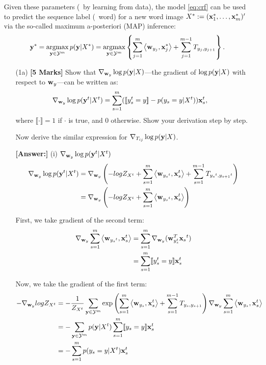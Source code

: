 \documentclass[11pt]{report}
\begin{document}
Given these parameters (\eg\ by learning from data), the model \eqref{eq:crf} can be used to predict the sequence label (\ie\ word) for a new word image $X^* := (\mathbf{\boldsymbol{x}}^*_1, \ldots, \mathbf{\boldsymbol{x}}^*_m)'$ via the so-called maximum a-posteriori (MAP) inference:
\begin{align}
	\label{eq:crf_decode}
	\mathbf{\boldsymbol{y}}^* = \operatorname*{\mathrm{argmax}}_{\mathbf{\boldsymbol{y}} \in \mathcal{Y}^m} p(\mathbf{\boldsymbol{y}} | X^*)
	= \operatorname*{\mathrm{argmax}}_{\mathbf{\boldsymbol{y}} \in \mathcal{Y}^m} \left\{ \sum_{j=1}^m \left\langle \mathbf{\boldsymbol{w}}_{y_j},\mathbf{\boldsymbol{x}}^*_j \right\rangle + \sum_{j=1}^{m-1} T_{y_j, y_{j+1}}\right\}.
\end{align}




\begin{itemize}
	\item[(1a)] {\bf [5 Marks]} Show that ${\nabla}_{\mathbf{\boldsymbol{w}}_y} \log p(\mathbf{\boldsymbol{y}}|X)$---the gradient of $\log p(\mathbf{\boldsymbol{y}}|X)$ with respect to $\mathbf{\boldsymbol{w}}_y$---can be written as:
	\begin{align}
		{\nabla}_{\mathbf{\boldsymbol{w}}_y} \log p(\mathbf{\boldsymbol{y}}^t|X^t) &= \sum_{s=1}^m ([\![y^t_s = y]\!] - p(y_s = y | X^t)) \mathbf{\boldsymbol{x}}^t_s,
	\end{align}
	where $\llbracket \cdot \rrbracket = 1$ if $\cdot$ is true, and 0 otherwise.
	Show your derivation step by step.
	
	Now derive the similar expression for ${\nabla}_{T_{ij}} \log p(\mathbf{\boldsymbol{y}}|X)$.
	
		{\bf [Answer:]} 
	(i) ${\nabla}_{\mathbf{\boldsymbol{w}}_y} \log p(\mathbf{\boldsymbol{y}}^t|X^t)$
	\begin{align}
		{\nabla}_{\mathbf{\boldsymbol{w}}_y} \log p(\mathbf{\boldsymbol{y}}^t|X^t) &= {\nabla}_{\mathbf{\boldsymbol{w}}_y} \left(-logZ_{X^t} + \sum_{s=1}^m \left\langle \mathbf{\boldsymbol{w}}_{{y_s}^t},\mathbf{\boldsymbol{x}}_s^t \right\rangle + \sum_{s=1}^{m-1} T_{{y_s}^t, {y_{s+1}}^t}\right) \\ 
		&={\nabla}_{\mathbf{\boldsymbol{w}}_y} \left(-logZ_{X^t} + \sum_{s=1}^m \left\langle \mathbf{\boldsymbol{w}}_{{y_s}^t},\mathbf{\boldsymbol{x}}_s^t \right\rangle\right)
	\end{align}

	First, we take gradient of the second term: 
	\begin{align}
		{\nabla}_{\mathbf{\boldsymbol{w}}_y} \sum_{s=1}^m \left\langle \mathbf{\boldsymbol{w}}_{{y_s}^t},\mathbf{\boldsymbol{x}}_s^t \right\rangle &= \sum_{s=1}^m {\nabla}_{\mathbf{\boldsymbol{w}}_y} (\mathbf{\boldsymbol{w}}_{y_s^t}^T {{\mathbf{\boldsymbol{x}}_s}^t}) \\
		&= \sum_{s=1}^m [\![y^t_s = y]\!] \mathbf{\boldsymbol{x}}^t_s
	\end{align}

	Now, we take the gradient of the first term: 
	\begin{align}
		\label{eq:gradient_wy}
		-{\nabla}_{\mathbf{\boldsymbol{w}}_y} logZ_{X^t} &= -\frac{1}{Z_{X^t}} \sum_{\mathbf{\boldsymbol{y}} \in \mathcal{Y}^m}\exp \left(\sum_{s=1}^m \left\langle \mathbf{\boldsymbol{w}}_{y_s},\mathbf{\boldsymbol{x}}_s^t \right\rangle + \sum_{s=1}^{m-1} T_{y_s, y_{s+1}}\right) {\nabla}_{\mathbf{\boldsymbol{w}}_y} \sum_{s=1}^m \left\langle \mathbf{\boldsymbol{w}}_{y_s},\mathbf{\boldsymbol{x}}_s^t \right\rangle \\
		&= -\sum_{\mathbf{\boldsymbol{y}} \in \mathcal{Y}^m}p(\mathbf{\boldsymbol{y}}|X^t) \sum_{s=1}^m [\![y_s = y]\!] \mathbf{\boldsymbol{x}}^t_s \\
		&= -\sum_{s=1}^m p(y_s = y|X^t)\mathbf{\boldsymbol{x}}^t_s
	\end{align}


\end{itemize}
\end{document}
